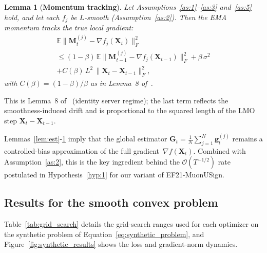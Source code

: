\documentclass[letterpaper]{article} %
\newtheorem{lemma}{Lemma}
\begin{document}
\begin{lemma}[\textbf{Momentum tracking}]\label{lem:mom}
Let Assumptions~\ref{as:1}--\ref{as:3} and~\ref{as:5} hold, and let each $f_j$ be $L$-smooth (Assumption~\ref{as:2}). Then the EMA momentum tracks the true local gradient:
\begin{multline}
\mathbb{E}\|\mathbf{M}_t^{(j)}-\nabla f_j(\mathbf{X}_t)\|_F^2 \\
\le (1-\beta)\,\mathbb{E}\|\mathbf{M}_{t-1}^{(j)}-\nabla f_j(\mathbf{X}_{t-1})\|_F^2 + \beta\,\sigma^2 \\
+ C(\beta)\,L^2\,\|\mathbf{X}_t-\mathbf{X}_{t-1}\|_F^2,
\end{multline}
with $C(\beta)=(1-\beta)/\beta$ as in Lemma~8 of~\cite{gruntkowska2025error}.
\end{lemma}
\noindent This is Lemma~8 of~\cite{gruntkowska2025error} (identity server regime); the last term reflects the smoothness-induced drift and is proportional to the squared length of the LMO step $\mathbf{X}_t-\mathbf{X}_{t-1}$.

Lemmas~\ref{lem:est}-\ref{lem:mom} imply that the global estimator $\mathbf{G}_t=\tfrac{1}{N}\sum_{j=1}^N\mathbf{g}_t^{(j)}$ remains a controlled-bias approximation of the full gradient~$\nabla f(\mathbf{X}_t)$. Combined with Assumption~\ref{as:2}, this is the key ingredient behind the $\mathcal{O}(T^{-1/2})$ rate postulated in Hypothesis~\ref{hyp:1} for our variant of EF21-MuonUSign.



\subsection{Results for the smooth convex problem}\label{app:images_task}
Table~\ref{tab:grid_search} details the grid-search ranges used for each optimizer on the synthetic problem of Equation~\ref{eq:synthetic_problem}, and Figure~\ref{fig:synthetic_results} shows the loss and gradient-norm dynamics.
\end{document}
